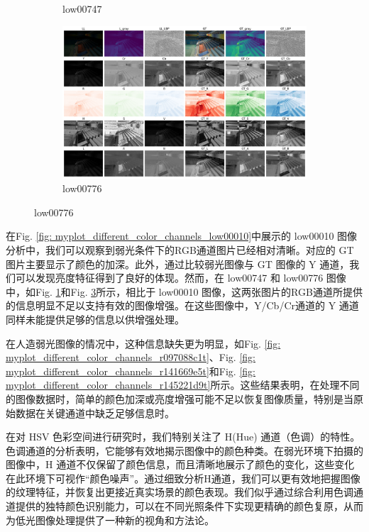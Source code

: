 \documentclass[a4paper]{ctexart}
\begin{document}
\begin{figure}[htbp]
\begin{subfigure}{0.3\textwidth}
				\captionsetup{font=scriptsize}
				\caption{low00747}
				\label{fig: myplot_different_color_channels_low00747}	
			\end{subfigure}
			\begin{subfigure}{0.3\textwidth}
				\includegraphics[width=\linewidth]{picture/LLIE/Experiment/myplot_different_color_channels_low00776}
				\captionsetup{font=scriptsize}
				\caption{low00776}
				\label{fig: myplot_different_color_channels_low00776}	
			\end{subfigure}
		\end{figure}
		
		\FloatBarrier
		
		在Fig. \ref{fig: myplot_different_color_channels_low00010}中展示的 low00010 图像分析中，我们可以观察到弱光条件下的RGB通道图片已经相对清晰。对应的 GT 图片主要显示了颜色的加深。此外，通过比较弱光图像与 GT 图像的 Y 通道，我们可以发现亮度特征得到了良好的体现。然而，在 low00747 和 low00776 图像中，如Fig. \ref{fig: myplot_different_color_channels_low00747}和Fig. \ref{fig: myplot_different_color_channels_low00776}所示，相比于 low00010 图像，这两张图片的RGB通道所提供的信息明显不足以支持有效的图像增强。在这些图像中，Y/Cb/Cr通道的 Y 通道同样未能提供足够的信息以供增强处理。
		
		在人造弱光图像的情况中，这种信息缺失更为明显，如Fig. \ref{fig: myplot_different_color_channels_r097088c1t}、Fig. \ref{fig: myplot_different_color_channels_r141669e5t}和Fig. \ref{fig: myplot_different_color_channels_r145221d9t}所示。这些结果表明，在处理不同的图像数据时，简单的颜色加深或亮度增强可能不足以恢复图像质量，特别是当原始数据在关键通道中缺乏足够信息时。
		
		
		在对 HSV 色彩空间进行研究时，我们特别关注了 H(Hue) 通道（色调）的特性。色调通道的分析表明，它能够有效地揭示图像中的颜色种类。在弱光环境下拍摄的图像中，H 通道不仅保留了颜色信息，而且清晰地展示了颜色的变化，这些变化在此环境下可视作“颜色噪声”。通过细致分析H通道，我们可以更有效地把握图像的纹理特征，并恢复出更接近真实场景的颜色表现。我们似乎通过综合利用色调通道提供的独特颜色识别能力，可以在不同光照条件下实现更精确的颜色复原，从而为低光图像处理提供了一种新的视角和方法论。
		
\end{document}
